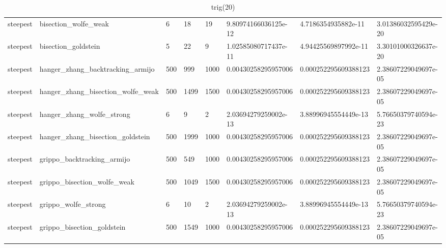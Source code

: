 \documentclass[a4paper,11pt]{article}
\numberwithin{equation}{section} %
\begin{document}
\begin{table}[h!]
{\begin{tabular}{|l|l|l|l|l|l|l|l|}
        steepest & bisection\_wolfe\_weak & 6 & 18 & 19 & 9.80974166036125e-12 & 4.7186354935882e-11 & 3.01386032595429e-20 \\
        steepest & bisection\_goldstein & 5 & 22 & 9 & 1.02585080717437e-11 & 4.94425569897992e-11 & 3.30101000326637e-20 \\
        steepest & hanger\_zhang\_backtracking\_armijo & 500 & 999 & 1000 & 0.00430258295957006 & 0.000252295609388123 & 2.38607229049697e-05 \\
        steepest & hanger\_zhang\_bisection\_wolfe\_weak & 500 & 1499 & 1500 & 0.00430258295957006 & 0.000252295609388123 & 2.38607229049697e-05 \\
        steepest & hanger\_zhang\_wolfe\_strong & 6 & 9 & 2 & 2.03694279259002e-13 & 3.88996945554449e-13 & 5.76650379740594e-23 \\
        steepest & hanger\_zhang\_bisection\_goldstein & 500 & 1999 & 1000 & 0.00430258295957006 & 0.000252295609388123 & 2.38607229049697e-05 \\
        steepest & grippo\_backtracking\_armijo & 500 & 549 & 1000 & 0.00430258295957006 & 0.000252295609388123 & 2.38607229049697e-05 \\
        steepest & grippo\_bisection\_wolfe\_weak & 500 & 1049 & 1500 & 0.00430258295957006 & 0.000252295609388123 & 2.38607229049697e-05 \\
        steepest & grippo\_wolfe\_strong & 6 & 10 & 2 & 2.03694279259002e-13 & 3.88996945554449e-13 & 5.76650379740594e-23 \\
        steepest & grippo\_bisection\_goldstein & 500 & 1549 & 1000 & 0.00430258295957006 & 0.000252295609388123 & 2.38607229049697e-05 \\

\end{tabular}}
\caption{trig(20)}
\label{table:trig(20)}
\end{table}
\end{document}
